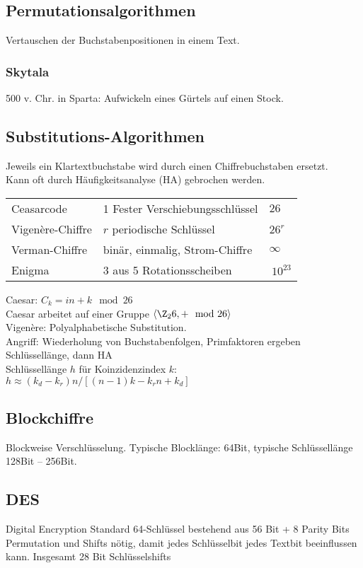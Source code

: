 \documentclass[fs]{latex4ei}
\begin{document}
\begin{multicols}{4}
	\subsection{Permutationsalgorithmen}
	Vertauschen der Buchstabenpositionen in einem Text. 
		
		\subsubsection{Skytala}
		500 v. Chr. in Sparta: Aufwickeln eines Gürtels auf einen Stock.\\
	

	\subsection{Substitutions-Algorithmen}
	Jeweils ein Klartextbuchstabe wird durch einen Chiffrebuchstaben ersetzt.\\
	Kann oft durch Häufigkeitsanalyse (HA) gebrochen werden.

		\begin{tabular}{lll}
			Ceasarcode & 1 Fester Verschiebungsschlüssel & $26$\\
			Vigenère-Chiffre & $r$ periodische Schlüssel & $26^r$\\
			Verman-Chiffre & binär, einmalig, Strom-Chiffre & $\infty$\\
			Enigma & 3 aus 5 Rotationsscheiben & $~10^{23}$
		\end{tabular}
		
	
	Caesar: $C_k = in + k \mod 26$\\
	Caesar arbeitet auf einer Gruppe $\langle \Z_26, + \mod 26 \rangle$\\
	Vigenère: Polyalphabetische Substitution.\\
		Angriff: Wiederholung von Buchstabenfolgen, Primfaktoren ergeben Schlüssellänge, dann HA\\
		Schlüssellänge $h$ für Koinzidenzindex $k$: $h \approx (k_d - k_r) n / [(n-1) k - k_rn + k_d]$



	\subsection{Blockchiffre}
	Blockweise Verschlüsselung.
	Typische Blocklänge: 64Bit, typische Schlüssellänge 128Bit -- 256Bit.\\
	
	
		\subsection{DES}
		Digital Encryption Standard
		64-Schlüssel bestehend aus 56 Bit + 8 Parity Bits\\
		Permutation und Shifts nötig, damit jedes Schlüsselbit jedes Textbit beeinflussen kann.
		Insgesamt 28 Bit Schlüsselshifts
	

\end{multicols}
\end{document}
